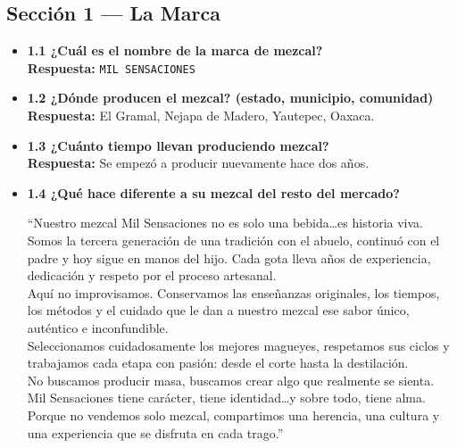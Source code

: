 \documentclass[11pt,letterpaper]{article}
\begin{document}
\subsection{Sección 1 — La Marca}
\begin{itemize}[leftmargin=1.5em]
    \item \textbf{1.1 ¿Cuál es el nombre de la marca de mezcal?}\\
    \textbf{Respuesta:} \texttt{MIL SENSACIONES}

    \item \textbf{1.2 ¿Dónde producen el mezcal? (estado, municipio, comunidad)}\\
    \textbf{Respuesta:} El Gramal, Nejapa de Madero, Yautepec, Oaxaca.

    \item \textbf{1.3 ¿Cuánto tiempo llevan produciendo mezcal?}\\
    \textbf{Respuesta:} Se empezó a producir nuevamente hace dos años.

    \item \textbf{1.4 ¿Qué hace diferente a su mezcal del resto del mercado?}
    \begin{answerbox}
    ``Nuestro mezcal Mil Sensaciones no es solo una bebida\dots es historia viva. Somos la tercera generación de una tradición con el abuelo, continuó con el padre y hoy sigue en manos del hijo. Cada gota lleva años de experiencia, dedicación y respeto por el proceso artesanal.\\
    Aquí no improvisamos. Conservamos las enseñanzas originales, los tiempos, los métodos y el cuidado que le dan a nuestro mezcal ese sabor único, auténtico e inconfundible.\\
    Seleccionamos cuidadosamente los mejores magueyes, respetamos sus ciclos y trabajamos cada etapa con pasión: desde el corte hasta la destilación.\\
    No buscamos producir masa, buscamos crear algo que realmente se sienta.\\
    Mil Sensaciones tiene carácter, tiene identidad\dots y sobre todo, tiene alma.\\
    Porque no vendemos solo mezcal, compartimos una herencia, una cultura y una experiencia que se disfruta en cada trago.''
    \end{answerbox}


\end{itemize}
\end{document}
